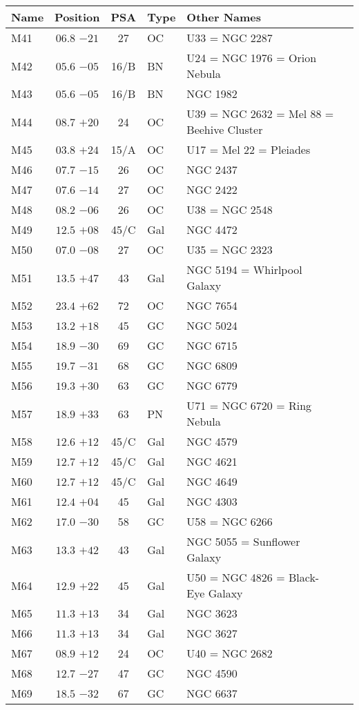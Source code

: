 \begin{table}[t]
\setlength{\tabcolsep}{3pt}
\small
\begin{tabular}{lcclll}
\hline
Name&Position&PSA&Type&Other Names\\
\hline
M41  &$06.8$ $-21$&27&OC &U33 = NGC 2287\\
M42  &$05.6$ $-05$&16/B&BN &U24 = NGC 1976 = Orion Nebula\\
M43  &$05.6$ $-05$&16/B&BN &NGC 1982\\
M44  &$08.7$ $+20$&24&OC &U39 = NGC 2632 = Mel 88 = Beehive Cluster\\
M45  &$03.8$ $+24$&15/A&OC &U17 = Mel 22 = Pleiades\\
M46  &$07.7$ $-15$&26&OC &NGC 2437\\
M47  &$07.6$ $-14$&27&OC &NGC 2422\\
M48  &$08.2$ $-06$&26&OC &U38 = NGC 2548\\
M49  &$12.5$ $+08$&45/C&Gal&NGC 4472\\
M50  &$07.0$ $-08$&27&OC &U35 = NGC 2323\\
M51  &$13.5$ $+47$&43&Gal&NGC 5194 = Whirlpool Galaxy\\
M52  &$23.4$ $+62$&72&OC &NGC 7654\\
M53  &$13.2$ $+18$&45&GC &NGC 5024\\
M54  &$18.9$ $-30$&69&GC &NGC 6715\\
M55  &$19.7$ $-31$&68&GC &NGC 6809\\
M56  &$19.3$ $+30$&63&GC &NGC 6779\\
M57  &$18.9$ $+33$&63&PN &U71 = NGC 6720 = Ring Nebula\\
M58  &$12.6$ $+12$&45/C&Gal&NGC 4579\\
M59  &$12.7$ $+12$&45/C&Gal&NGC 4621\\
M60  &$12.7$ $+12$&45/C&Gal&NGC 4649\\
M61  &$12.4$ $+04$&45&Gal&NGC 4303\\
M62  &$17.0$ $-30$&58&GC &U58 = NGC 6266\\
M63  &$13.3$ $+42$&43&Gal&NGC 5055 = Sunflower Galaxy\\
M64  &$12.9$ $+22$&45&Gal&U50 = NGC 4826 = Black-Eye Galaxy\\
M65  &$11.3$ $+13$&34&Gal&NGC 3623\\
M66  &$11.3$ $+13$&34&Gal&NGC 3627\\
M67  &$08.9$ $+12$&24&OC &U40 = NGC 2682\\
M68  &$12.7$ $-27$&47&GC &NGC 4590\\
M69  &$18.5$ $-32$&67&GC &NGC 6637\\

\end{tabular}
\end{table}
